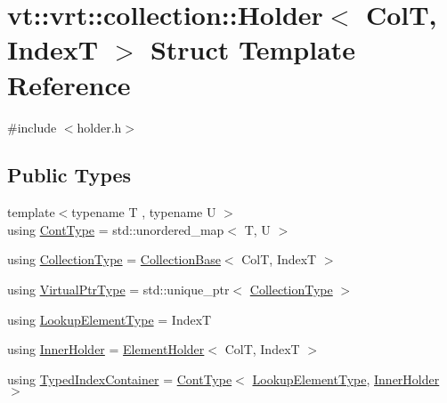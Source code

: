 \hypertarget{structvt_1_1vrt_1_1collection_1_1_holder}{}\section{vt\+:\+:vrt\+:\+:collection\+:\+:Holder$<$ ColT, IndexT $>$ Struct Template Reference}
\label{structvt_1_1vrt_1_1collection_1_1_holder}


{\ttfamily \#include $<$holder.\+h$>$}

\subsection*{Public Types}
\begin{DoxyCompactItemize}
\item 
{\footnotesize template$<$typename T , typename U $>$ }\\using \hyperlink{structvt_1_1vrt_1_1collection_1_1_holder_ae3bb115b69cf47e14a4e8441cebe9142}{Cont\+Type} = std\+::unordered\+\_\+map$<$ T, U $>$
\item 
using \hyperlink{structvt_1_1vrt_1_1collection_1_1_holder_a38b4a4bfc4408cf28918c32433c80aac}{Collection\+Type} = \hyperlink{structvt_1_1vrt_1_1collection_1_1_collection_base}{Collection\+Base}$<$ ColT, IndexT $>$
\item 
using \hyperlink{structvt_1_1vrt_1_1collection_1_1_holder_a04ba57a7b2c48ce6b4c90d3f3b33f43c}{Virtual\+Ptr\+Type} = std\+::unique\+\_\+ptr$<$ \hyperlink{structvt_1_1vrt_1_1collection_1_1_holder_a38b4a4bfc4408cf28918c32433c80aac}{Collection\+Type} $>$
\item 
using \hyperlink{structvt_1_1vrt_1_1collection_1_1_holder_a3206c3e5eb5d6deb4667409222163b77}{Lookup\+Element\+Type} = IndexT
\item 
using \hyperlink{structvt_1_1vrt_1_1collection_1_1_holder_aafc9b515450179bad7f03e17010b59f8}{Inner\+Holder} = \hyperlink{structvt_1_1vrt_1_1collection_1_1_element_holder}{Element\+Holder}$<$ ColT, IndexT $>$
\item 
using \hyperlink{structvt_1_1vrt_1_1collection_1_1_holder_ae8d4ff940c971d52b237cf4d6049380a}{Typed\+Index\+Container} = \hyperlink{structvt_1_1vrt_1_1collection_1_1_holder_ae3bb115b69cf47e14a4e8441cebe9142}{Cont\+Type}$<$ \hyperlink{structvt_1_1vrt_1_1collection_1_1_holder_a3206c3e5eb5d6deb4667409222163b77}{Lookup\+Element\+Type}, \hyperlink{structvt_1_1vrt_1_1collection_1_1_holder_aafc9b515450179bad7f03e17010b59f8}{Inner\+Holder} $>$

\end{DoxyCompactItemize}
